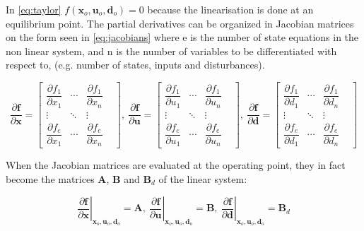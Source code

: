 In \cref{eq:taylor} $f(\textbf{x}_o, \textbf{u}_o, \textbf{d}_o) = 0$ because the linearisation is done at an equilibrium point. The partial derivatives can be organized in Jacobian matrices on the form seen in \cref{eq:jacobians} where e is the number of state equations in the non linear system, and n is the number of variables to be differentiated with respect to, (e.g. number of states, inputs and disturbances).

\begin{equation} \label{eq:jacobians}
	\dfrac{\partial \textbf{f}}{\partial \textbf{x}} =
		\begin{bmatrix}
			\dfrac{\partial f_1}{\partial x_1} & \cdots & \dfrac{\partial f_1}{\partial x_n} & \\
			\vdots & \ddots & \vdots & \\
			\dfrac{\partial f_e}{\partial x_1} & \cdots & \dfrac{\partial f_e}{\partial x_n} &
		\end{bmatrix}, \
	\dfrac{\partial \textbf{f}}{\partial \textbf{u}} =
		\begin{bmatrix}
			\dfrac{\partial f_1}{\partial u_1} & \cdots & \dfrac{\partial f_1}{\partial u_n} & \\
			\vdots & \ddots & \vdots & \\
			\dfrac{\partial f_e}{\partial u_1} & \cdots & \dfrac{\partial f_e}{\partial u_n} &
		\end{bmatrix}, \
	\dfrac{\partial \textbf{f}}{\partial \textbf{d}} =
		\begin{bmatrix}
			\dfrac{\partial f_1}{\partial d_1} & \cdots & \dfrac{\partial f_1}{\partial d_n} & \\
			\vdots & \ddots & \vdots & \\
			\dfrac{\partial f_e}{\partial d_1} & \cdots & \dfrac{\partial f_e}{\partial d_n} &
		\end{bmatrix}
\end{equation}

When the Jacobian matrices are evaluated at the operating point, they in fact become the matrices $ \textbf{A} $, $ \textbf{B} $ and $ \textbf{B}_d  $ of the linear system:

\begin{equation}
	\left. \dfrac{\partial \textbf{f}}{\partial \textbf{x}} \right |_{\textbf{x}_o, \textbf{u}_o, \textbf{d}_o} = \textbf{A}, \
	\left. \dfrac{\partial \textbf{f}}{\partial \textbf{u}} \right |_{\textbf{x}_o, \textbf{u}_o, \textbf{d}_o} = \textbf{B}, \
	\left. \dfrac{\partial \textbf{f}}{\partial \textbf{d}} \right |_{\textbf{x}_o, \textbf{u}_o, \textbf{d}_o} = \textbf{B}_d
\end{equation}

